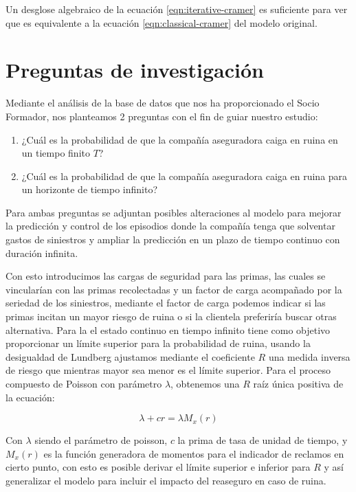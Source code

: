 \documentclass[journal]{IEEEtran}
\begin{document}
            Un desglose algebraico de la ecuación \ref{eqn:iterative-cramer} es suficiente para ver que es equivalente a la ecuación \ref{eqn:classical-cramer} del modelo original.
            
    \section{Preguntas de investigación}

        Mediante el análisis de la base de datos que nos ha proporcionado el Socio Formador, nos planteamos 2 preguntas con el fin de guiar nuestro estudio:
    
        \begin{enumerate}
            \item ¿Cuál es la probabilidad de que la compañía aseguradora caiga en ruina en un tiempo finito $T$?
            \item ¿Cuál es la probabilidad de que la compañía aseguradora caiga en ruina para un horizonte de tiempo infinito?
        \end{enumerate}
        
        Para ambas preguntas se adjuntan posibles alteraciones al modelo para mejorar la predicción y control de los episodios donde la compañía tenga que solventar gastos de siniestros y ampliar la predicción en un plazo de tiempo continuo con duración infinita.
        
        Con esto introducimos las cargas de seguridad para las primas, las cuales se vincularían con las primas recolectadas y un factor de carga acompañado por la seriedad de los siniestros, mediante el factor de carga podemos indicar si las primas incitan un mayor riesgo de ruina o si la clientela preferiría buscar otras alternativa. Para la el estado continuo en tiempo infinito tiene como objetivo proporcionar un límite superior para la probabilidad de ruina, usando la desigualdad de Lundberg ajustamos mediante el coeficiente $R$ una medida inversa de riesgo que mientras mayor sea menor es el límite superior. Para el proceso compuesto de Poisson con parámetro $\lambda$, obtenemos una $R$ raíz única positiva de la ecuación:
        
        \begin{equation}
            \lambda + cr = \lambda M_x(r)
        \end{equation} 
        
        Con $\lambda$ siendo el parámetro de poisson, $c$ la prima de tasa de unidad de tiempo, y $M_x(r)$ es la función generadora de momentos para el indicador de reclamos en cierto punto, con esto es posible derivar el límite superior e inferior para $R$ y así generalizar el modelo para incluir el impacto del reaseguro en caso de ruina.
\end{document}

